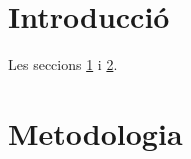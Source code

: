 \documentclass{article}
\begin{document}
\section{Introducció}
\label{sec:intro}

Les seccions \ref{sec:intro} i \ref{sec:metod}.

\section{Metodologia}\label{sec:metod}
 
\end{document}
